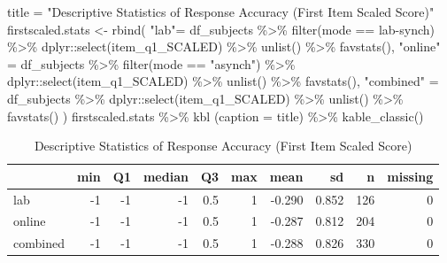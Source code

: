 \documentclass[
  letterpaper,
  DIV=11,
  numbers=noendperiod]{scrreprt}
\newenvironment{Shaded}{\begin{snugshade}}{\end{snugshade}}
\newcommand{\AttributeTok}[1]{\textcolor[rgb]{0.40,0.45,0.13}{#1}}
\newcommand{\FunctionTok}[1]{\textcolor[rgb]{0.28,0.35,0.67}{#1}}
\newcommand{\NormalTok}[1]{\textcolor[rgb]{0.00,0.23,0.31}{#1}}
\newcommand{\OtherTok}[1]{\textcolor[rgb]{0.00,0.23,0.31}{#1}}
\newcommand{\SpecialCharTok}[1]{\textcolor[rgb]{0.37,0.37,0.37}{#1}}
\newcommand{\StringTok}[1]{\textcolor[rgb]{0.13,0.47,0.30}{#1}}
\begin{document}
\begin{Shaded}
\begin{Highlighting}[]
\NormalTok{title }\OtherTok{=} \StringTok{"Descriptive Statistics of Response Accuracy (First Item Scaled Score)"}
\NormalTok{firstscaled.stats }\OtherTok{\textless{}{-}} \FunctionTok{rbind}\NormalTok{(}
  \StringTok{"lab"}\OtherTok{=}\NormalTok{ df\_subjects }\SpecialCharTok{\%\textgreater{}\%} \FunctionTok{filter}\NormalTok{(mode }\SpecialCharTok{==} \StringTok{\textquotesingle{}lab{-}synch\textquotesingle{}}\NormalTok{) }\SpecialCharTok{\%\textgreater{}\%}\NormalTok{ dplyr}\SpecialCharTok{::}\FunctionTok{select}\NormalTok{(item\_q1\_SCALED) }\SpecialCharTok{\%\textgreater{}\%} \FunctionTok{unlist}\NormalTok{() }\SpecialCharTok{\%\textgreater{}\%} \FunctionTok{favstats}\NormalTok{(),}
  \StringTok{"online"} \OtherTok{=}\NormalTok{ df\_subjects }\SpecialCharTok{\%\textgreater{}\%} \FunctionTok{filter}\NormalTok{(mode }\SpecialCharTok{==} \StringTok{"asynch"}\NormalTok{) }\SpecialCharTok{\%\textgreater{}\%}\NormalTok{ dplyr}\SpecialCharTok{::}\FunctionTok{select}\NormalTok{(item\_q1\_SCALED) }\SpecialCharTok{\%\textgreater{}\%} \FunctionTok{unlist}\NormalTok{() }\SpecialCharTok{\%\textgreater{}\%} \FunctionTok{favstats}\NormalTok{(),}
  \StringTok{"combined"} \OtherTok{=}\NormalTok{ df\_subjects }\SpecialCharTok{\%\textgreater{}\%}\NormalTok{ dplyr}\SpecialCharTok{::}\FunctionTok{select}\NormalTok{(item\_q1\_SCALED) }\SpecialCharTok{\%\textgreater{}\%} \FunctionTok{unlist}\NormalTok{() }\SpecialCharTok{\%\textgreater{}\%} \FunctionTok{favstats}\NormalTok{()}
\NormalTok{) }
\NormalTok{firstscaled.stats }\SpecialCharTok{\%\textgreater{}\%} \FunctionTok{kbl}\NormalTok{ (}\AttributeTok{caption =}\NormalTok{ title) }\SpecialCharTok{\%\textgreater{}\%} \FunctionTok{kable\_classic}\NormalTok{()}
\end{Highlighting}
\end{Shaded}

\begin{table}

\caption{Descriptive Statistics of Response Accuracy (First Item Scaled Score)}
\centering
\begin{tabular}[t]{l|r|r|r|r|r|r|r|r|r}
\hline
  & min & Q1 & median & Q3 & max & mean & sd & n & missing\\
\hline
lab & -1 & -1 & -1 & 0.5 & 1 & -0.290 & 0.852 & 126 & 0\\
\hline
online & -1 & -1 & -1 & 0.5 & 1 & -0.287 & 0.812 & 204 & 0\\
\hline
combined & -1 & -1 & -1 & 0.5 & 1 & -0.288 & 0.826 & 330 & 0\\
\hline
\end{tabular}
\end{table}
\end{document}
